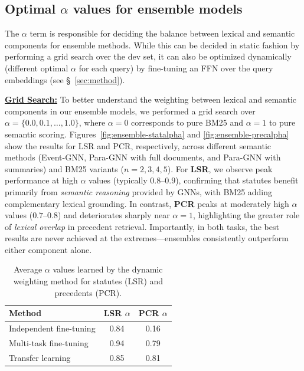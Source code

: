 \subsection{Optimal $\alpha$ values for ensemble models} \label{app:optimal-alpha}
The $\alpha$ term is responsible for deciding the balance between lexical and semantic components for ensemble methods. While this can be decided in static fashion by performing a grid search over the dev set, it can also be optimized dynamically (different optimal $\alpha$ for each query) by fine-tuning an FFN over the query embeddings (see \S~\ref{sec:method}).

\vspace{1mm}
\noindent \underline{\bf Grid Search:} To better understand the weighting between lexical and semantic components in our ensemble models, we performed a grid search over $\alpha = \{0.0, 0.1, \ldots, 1.0\}$, where $\alpha=0$ corresponds to pure BM25 and $\alpha=1$ to pure semantic scoring. Figures~\ref{fig:ensemble-statalpha} and \ref{fig:ensemble-precalpha} show the results for LSR and PCR, respectively, across different semantic methods (Event-GNN, Para-GNN with full documents, and Para-GNN with summaries) and BM25 variants ($n=2,3,4,5$).
For \textbf{LSR}, we observe peak performance at high $\alpha$ values (typically $0.8$–$0.9$), confirming that statutes benefit primarily from \textit{semantic reasoning} provided by GNNs, with BM25 adding complementary lexical grounding. In contrast, \textbf{PCR} peaks at moderately high $\alpha$ values ($0.7$–$0.8$) and deteriorates sharply near $\alpha=1$, highlighting the greater role of \textit{lexical overlap} in precedent retrieval. Importantly, in both tasks, the best results are never achieved at the extremes—ensembles consistently outperform either component alone.

\begin{table}[!ht]
\centering
\small
\begin{tabular}{lcc}
\hline
\textbf{Method} & \textbf{LSR $\alpha$} & \textbf{PCR $\alpha$} \\
\hline
Independent fine-tuning & 0.84 & 0.16 \\
Multi-task fine-tuning   & 0.94 & 0.79 \\
Transfer learning        & 0.85 & 0.81 \\
\hline
\end{tabular}
\caption{Average $\alpha$ values learned by the dynamic weighting method for statutes (LSR) and precedents (PCR).}
\label{tab:dynalpha}
\end{table}

